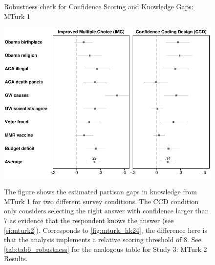 \label{si_alternate_coding}
\begin{center}
	\begin{figure}[ht]
		\centering
            \caption{Robustness check for Confidence Scoring and Knowledge Gaps: MTurk 1}
		\includegraphics[width=.9\textwidth]{../figs/partisan-gap-by-item-arm-14k-24k-greaterthan7.pdf}
		\label{fig:mturk_hk24_greaterthan7}
		\caption*{\footnotesize
		The figure shows the estimated partisan gaps in knowledge from MTurk 1 for two different survey conditions. The CCD condition only considers selecting the right answer with confidence larger than 7 as evidence that the respondent knows the answer (see \cref{si:mturk2}). Corresponds to \cref{fig:mturk_hk24}, the difference here is that the analysis implements a relative scoring threshold of 8. See \cref{tab:tab6_robustness} for the analogous table for Study 3: MTurk 2 Results.
		}
	\end{figure}
\end{center}


